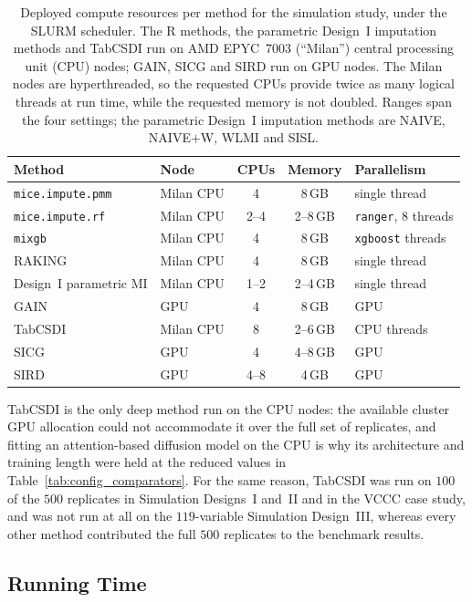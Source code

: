 \begin{table}[ht]
\centering
\caption{Deployed compute resources per method for the simulation study, under the SLURM scheduler. The R methods, the parametric Design~I imputation methods and TabCSDI run on AMD EPYC~7003 (``Milan'') central processing unit (CPU) nodes; GAIN, SICG and SIRD run on GPU nodes. The Milan nodes are hyperthreaded, so the requested CPUs provide twice as many logical threads at run time, while the requested memory is not doubled. Ranges span the four settings; the parametric Design~I imputation methods are NAIVE, NAIVE$+$W, WLMI and SISL.}
\label{tab:compute}
\setlength{\tabcolsep}{5pt}
\begin{tabular}{llccl}
\toprule
Method & Node & CPUs & Memory & Parallelism \\
\midrule
\texttt{mice.impute.pmm} & Milan CPU & 4 & 8\,GB & single thread \\
\texttt{mice.impute.rf} & Milan CPU & 2--4 & 2--8\,GB & \texttt{ranger}, 8 threads \\
\texttt{mixgb} & Milan CPU & 4 & 8\,GB & \texttt{xgboost} threads \\
RAKING & Milan CPU & 4 & 8\,GB & single thread \\
Design~I parametric MI & Milan CPU & 1--2 & 2--4\,GB & single thread \\
GAIN & GPU & 4 & 8\,GB & GPU \\
TabCSDI & Milan CPU & 8 & 2--6\,GB & CPU threads \\
SICG & GPU & 4 & 4--8\,GB & GPU \\
SIRD & GPU & 4--8 & 4\,GB & GPU \\
\bottomrule
\end{tabular}
\end{table}

TabCSDI is the only deep method run on the CPU nodes: the available cluster GPU allocation could not accommodate it over the full set of replicates, and fitting an attention-based diffusion model on the CPU is why its architecture and training length were held at the reduced values in Table~\ref{tab:config_comparators}. For the same reason, TabCSDI was run on $100$ of the $500$ replicates in Simulation Designs~I and~II and in the VCCC case study, and was not run at all on the $119$-variable Simulation Design~III, whereas every other method contributed the full $500$ replicates to the benchmark results.

\subsection{Running Time}
\label{app:runtime}

